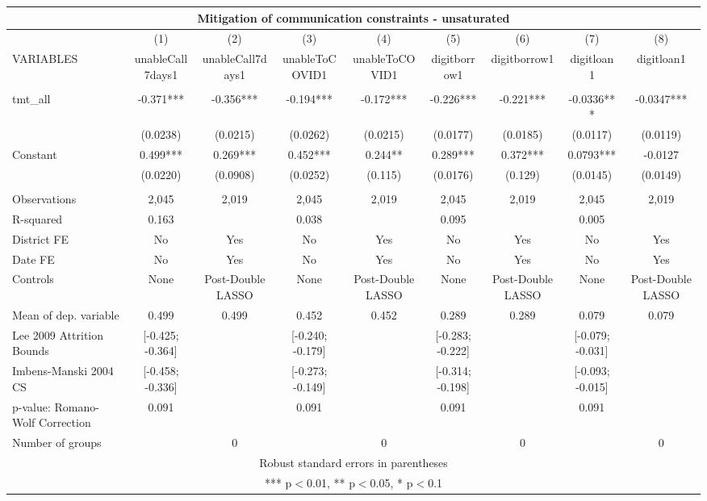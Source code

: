 \documentclass[]{article}
\begin{document}
\begin{tabular}{lcccccccc}
\multicolumn{9}{c}{Mitigation of communication constraints - unsaturated} \\ \hline
 & (1) & (2) & (3) & (4) & (5) & (6) & (7) & (8) \\
VARIABLES & unableCall7days1 & unableCall7days1 & unableToCOVID1 & unableToCOVID1 & digitborrow1 & digitborrow1 & digitloan1 & digitloan1 \\ \hline
 &  &  &  &  &  &  &  &  \\
tmt\_all & -0.371*** & -0.356*** & -0.194*** & -0.172*** & -0.226*** & -0.221*** & -0.0336*** & -0.0347*** \\
 & (0.0238) & (0.0215) & (0.0262) & (0.0215) & (0.0177) & (0.0185) & (0.0117) & (0.0119) \\
Constant & 0.499*** & 0.269*** & 0.452*** & 0.244** & 0.289*** & 0.372*** & 0.0793*** & -0.0127 \\
 & (0.0220) & (0.0908) & (0.0252) & (0.115) & (0.0176) & (0.129) & (0.0145) & (0.0149) \\
 &  &  &  &  &  &  &  &  \\
Observations & 2,045 & 2,019 & 2,045 & 2,019 & 2,045 & 2,019 & 2,045 & 2,019 \\
R-squared & 0.163 &  & 0.038 &  & 0.095 &  & 0.005 &  \\
District FE & No & Yes & No & Yes & No & Yes & No & Yes \\
Date FE & No & Yes & No & Yes & No & Yes & No & Yes \\
Controls & None & Post-Double LASSO & None & Post-Double LASSO & None & Post-Double LASSO & None & Post-Double LASSO \\
Mean of dep. variable & 0.499 & 0.499 & 0.452 & 0.452 & 0.289 & 0.289 & 0.079 & 0.079 \\
Lee 2009 Attrition Bounds & [-0.425; -0.364] &  & [-0.240; -0.179] &  & [-0.283; -0.222] &  & [-0.079; -0.031] &  \\
Imbens-Manski 2004 CS & [-0.458; -0.336] &  & [-0.273; -0.149] &  & [-0.314; -0.198] &  & [-0.093; -0.015] &  \\
p-value: Romano-Wolf Correction & 0.091 &  & 0.091 &  & 0.091 &  & 0.091 &  \\
 Number of groups &  & 0 &  & 0 &  & 0 &  & 0 \\ \hline
\multicolumn{9}{c}{ Robust standard errors in parentheses} \\
\multicolumn{9}{c}{ *** p$<$0.01, ** p$<$0.05, * p$<$0.1} \\
\end{tabular}
\end{document}
